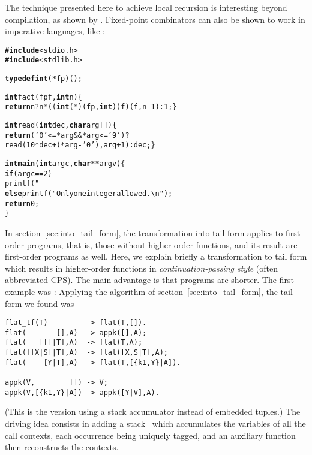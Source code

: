 The technique presented here to achieve local recursion is interesting
beyond compilation, as shown
by \cite{GoldbergWiener_2009}. Fixed\hyp{}point combinators can also
be shown to work in imperative languages, like \Clang:
\begin{alltt}
\textbf{#include}<stdio.h>
\textbf{#include}<stdlib.h>

\textbf{typedef int} (*fp)();

\textbf{int} fact(fp f, \textbf{int} n) \{
  \textbf{return} n? n * ((\textbf{int} (*)(fp,\textbf{int}))f)(f,n-1) : 1; \}

\textbf{int} read(\textbf{int} dec, \textbf{char} arg[]) \{
  \textbf{return} ('0' <= *arg && *arg <= '9')?
         read(10*dec+(*arg - '0'),arg+1) : dec; \}

\textbf{int main}(\textbf{int} argc, \textbf{char}** argv) \{
  \textbf{if} (argc == 2)
     printf("%u\textbackslash{n}",fact(&fact,read(0,argv[1])));
  \textbf{else} printf("Only one integer allowed.\textbackslash{n}");
  \textbf{return} 0;
\}
\end{alltt}


In section~\ref{sec:into_tail_form}, the transformation into tail form
applies to first\hyp{}order programs, that is, those without
higher\hyp{}order functions, and its result are first\hyp{}order
programs as well. Here, we explain briefly a transformation to tail
form which results in higher\hyp{}order functions in
\emph{continuation\hyp{}passing style}
(often abbreviated CPS). The main advantage is that programs are
shorter. The first example was :
 Applying the algorithm of
section~\ref{sec:into_tail_form}, the tail form we found was
\begin{verbatim}
flat_tf(T)         -> flat(T,[]).
flat(       [],A)  -> appk([],A);
flat(   [[]|T],A)  -> flat(T,A);
flat([[X|S]|T],A)  -> flat([X,S|T],A);
flat(    [Y|T],A)  -> flat(T,[{k1,Y}|A]).

appk(V,        []) -> V;
appk(V,[{k1,Y}|A]) -> appk([Y|V],A).
\end{verbatim}
(This is the version using a stack accumulator instead of embedded
tuples.) The driving idea consists in adding a stack~ which
accumulates the variables of all the call contexts, each occurrence
being uniquely tagged, and an auxiliary function  then
reconstructs the contexts.

